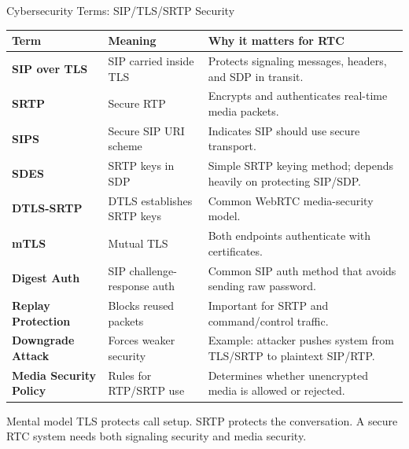 \documentclass[aspectratio=169]{beamer}
\begin{document}
\begin{frame}{Cybersecurity Terms: SIP/TLS/SRTP Security}
\tiny
\begin{tabular}{p{2.2cm} p{3.5cm} p{6.5cm}}
\toprule
\textbf{Term} & \textbf{Meaning} & \textbf{Why it matters for RTC} \\
\midrule
\textbf{SIP over TLS} & SIP carried inside TLS & Protects signaling messages, headers, and SDP in transit. \\
\textbf{SRTP} & Secure RTP & Encrypts and authenticates real-time media packets. \\
\textbf{SIPS} & Secure SIP URI scheme & Indicates SIP should use secure transport. \\
\textbf{SDES} & SRTP keys in SDP & Simple SRTP keying method; depends heavily on protecting SIP/SDP. \\
\textbf{DTLS-SRTP} & DTLS establishes SRTP keys & Common WebRTC media-security model. \\
\textbf{mTLS} & Mutual TLS & Both endpoints authenticate with certificates. \\
\textbf{Digest Auth} & SIP challenge-response auth & Common SIP auth method that avoids sending raw password. \\
\textbf{Replay Protection} & Blocks reused packets & Important for SRTP and command/control traffic. \\
\textbf{Downgrade Attack} & Forces weaker security & Example: attacker pushes system from TLS/SRTP to plaintext SIP/RTP. \\
\textbf{Media Security Policy} & Rules for RTP/SRTP use & Determines whether unencrypted media is allowed or rejected. \\
\bottomrule
\end{tabular}

\vspace{0.15cm}
\begin{block}{Mental model}
TLS protects call setup. SRTP protects the conversation. A secure RTC system needs both signaling security and media security.
\end{block}
\end{frame}
\end{document}

